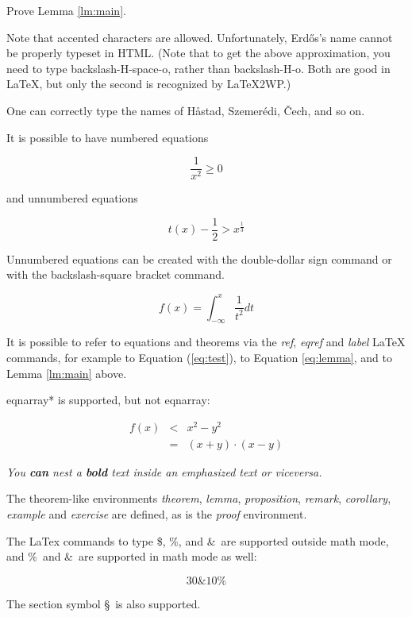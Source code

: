 \documentclass[12pt]{article}
\begin{document}
\begin{exercise}[Advanced] Prove Lemma \ref{lm:main}. \end{exercise}

Note that accented characters are allowed. Unfortunately,
Erd\H os's name cannot be properly typeset in HTML.
(Note that to get the above approximation, you need to type
backslash-H-space-o, rather than backslash-H-{o}. Both are
good in LaTeX, but only the second is recognized by LaTeX2WP.)

One can correctly type the names of H\aa stad, Szemer\'edi,
\v{C}ech, and so on.

It is possible to have numbered equations

\begin{equation} \label{eq:test} \frac 1 {x^2} \ge 0 \end{equation}

and unnumbered equations

$$ t(x) - \frac 12 > x^{\frac 13} $$

Unnumbered equations can be created with the double-dollar sign
command or with the backslash-square bracket command.

\[ f(x) = \int_{-\infty}^{x} \frac 1 {t^2} dt \]

It is possible to refer to equations and
theorems via the {\em ref}, {\em eqref} and {\em label} LaTeX
commands, for example to Equation (\ref{eq:test}),
to Equation \eqref{eq:lemma},
and to Lemma \ref{lm:main} above.

eqnarray* is supported, but not eqnarray:


\begin{eqnarray*}
f(x) & <  & x^2 - y^2\\
& = & (x+y) \cdot (x-y)
\end{eqnarray*}

{\em You {\bf can} nest a {\bf bold} text inside an emphasized
text or viceversa.}



The theorem-like environments {\em theorem}, {\em lemma},
{\em proposition}, {\em remark}, {\em corollary}, {\em example}
and {\em exercise} are defined, as is the {\em proof} environment.

The LaTex commands to type \$, \%, and \&\ are supported outside
math mode, and \%\ and \&\ are supported in math mode as well:

\[  30 \&  10 \% \]

The section symbol \S\ is also supported.
\end{document}
